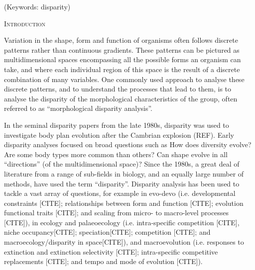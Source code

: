 \documentclass[12pt,letterpaper]{article}
\renewcommand{\section}[1]{%
\bigskip
\begin{center}
\begin{Large}
\normalfont\scshape #1
\medskip
\end{Large}
\end{center}}
\begin{document}
\noindent (Keywords: disparity)\\

\vspace{1.5in}

\newpage 

%
%

\section{Introduction}

Variation in the shape, form and function of organisms often follows discrete patterns rather than continuous gradients.
These patterns can be pictured as multidimensional spaces encompassing all the possible forms an organism can take, and where each individual region of this space is the result of a discrete combination of many variables.
One commonly used approach to analyse these discrete patterns, and to understand the processes that lead to them, is to analyse the disparity of the morphological characteristics of the group, often referred to as ``morphological disparity analysis''.

In the seminal disparity papers from the late 1980s, disparity was used to investigate body plan evolution after the Cambrian explosion (REF).
Early disparity analyses focused on broad questions such as How does diversity evolve? Are some body types more common than others? Can shape evolve in all ``directions'' (of the multidimensional space)?
Since the 1980s, a great deal of literature from a range of sub-fields in biology, and an equally large number of methods, have used the term ``disparity''.
Disparity analysis has been used to tackle a vast array of questions, for example in evo-devo (i.e. developmental constraints [CITE]; relationships between form and function [CITE]; evolution functional traits [CITE]; and scaling from micro- to macro-level processes [CITE]), in ecology and palaeoecology (i.e. intra-specific competition [CITE], niche occupancy[CITE]; speciation[CITE]; competition [CITE]; and macroecology/disparity in space[CITE]), and macroevolution (i.e. responses to extinction and extinction selectivity [CITE]; intra-specific competitive replacements [CITE]; and tempo and mode of evolution [CITE]).
\end{document}
